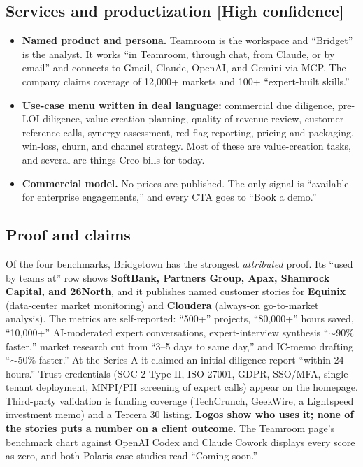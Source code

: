 \documentclass[11pt]{article}
\newcommand{\high}{\textcolor{green!45!black}{\textbf{[High confidence]}}}
\begin{document}
\subsection{Services and productization \high}
\begin{itemize}
  \item \textbf{Named product and persona.} Teamroom is the workspace and ``Bridget'' is
  the analyst. It works ``in Teamroom, through chat, from Claude, or by email'' and
  connects to Gmail, Claude, OpenAI, and Gemini via MCP. The company claims coverage
  of 12,000+ markets and 100+ ``expert-built skills.''
  \item \textbf{Use-case menu written in deal language:} commercial due diligence,
  pre-LOI diligence, value-creation planning, quality-of-revenue review, customer
  reference calls, synergy assessment, red-flag reporting, pricing and packaging,
  win-loss, churn, and channel strategy. Most of these are value-creation tasks, and
  several are things Creo bills for today.
  \item \textbf{Commercial model.} No prices are published. The only signal is
  ``available for enterprise engagements,'' and every CTA goes to ``Book a demo.''
\end{itemize}

\subsection{Proof and claims}
Of the four benchmarks, Bridgetown has the strongest \emph{attributed} proof. Its
``used by teams at'' row shows \textbf{SoftBank, Partners Group, Apax, Shamrock
Capital, and 26North}, and it publishes named customer stories for \textbf{Equinix}
(data-center market monitoring) and \textbf{Cloudera} (always-on go-to-market
analysis). The metrics are self-reported: ``500+'' projects, ``80,000+'' hours saved,
``10,000+'' AI-moderated expert conversations, expert-interview synthesis ``$\sim$90\%
faster,'' market research cut from ``3--5 days to same day,'' and IC-memo drafting
``$\sim$50\% faster.'' At the Series A it claimed an initial diligence report ``within
24 hours.'' Trust credentials (SOC 2 Type II, ISO 27001, GDPR, SSO/MFA, single-tenant
deployment, MNPI/PII screening of expert calls) appear on the homepage. Third-party
validation is funding coverage (TechCrunch, GeekWire, a Lightspeed investment memo)
and a Tercera 30 listing. \textbf{Logos show who uses it; none of the stories puts a
number on a client outcome}. The Teamroom page's benchmark chart against OpenAI Codex
and Claude Cowork displays every score as zero, and both Polaris case studies read
``Coming soon.''
\end{document}
